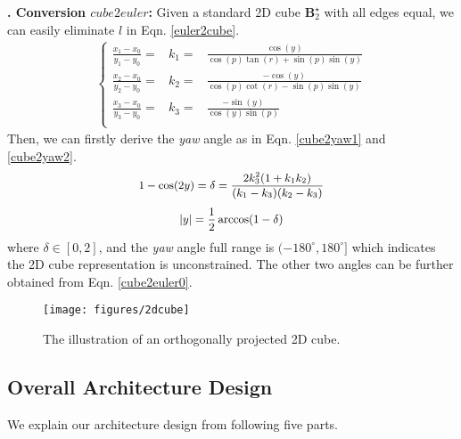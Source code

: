 \documentclass{article}
\begin{document}
{\bf {}. Conversion $cube2euler$:} Given a standard 2D cube $\mathbf{B}^\star_2$ with all edges equal, we can easily eliminate $l$ in Eqn. \ref{euler2cube}.
\begin{equation}\begin{aligned}
    \left\{ \begin{array}{rcl}
    \frac{x_1 - x_0}{y_1 - y_0} = & k_1 = & \frac{\cos(y)}{\cos(p)\tan(r) + \sin(p)\sin(y)} \\ 
    \frac{x_2 - x_0}{y_2 - y_0} = & k_2 = & \frac{-\cos(y)}{\cos(p)\cot(r) - \sin(p)\sin(y)} \\ 
    \frac{x_3 - x_0}{y_3 - y_0} = & k_3 = & \frac{-\sin(y)}{\cos(y)\sin(p)}\\ 
    \end{array}\right.
    \label{cube2euler0}
    \end{aligned}
\end{equation}
Then, we can firstly derive the {\it yaw} angle as in Eqn. \ref{cube2yaw1} and \ref{cube2yaw2}. 
\begin{equation}\small \begin{aligned}
    1 - \cos(2y) = \delta = \frac{2{k^2_3}(1 + k_1 k_2)}{(k_1 - k_3)(k_2 - k_3)}
    \label{cube2yaw1}
    \end{aligned}
\end{equation}
\begin{equation}\small \begin{aligned}
    |y| = \frac{1}{2}\arccos(1 - \delta)
    \label{cube2yaw2}
    \end{aligned}
\end{equation}
where $\delta \in [0, 2]$, and the {\it yaw} angle full range is $(-180^\circ, 180^\circ]$ which indicates the 2D cube representation is unconstrained. The other two angles can be further obtained from Eqn. \ref{cube2euler0}.

\begin{figure}[!t]
	\centering
	\texttt{[image: figures/2dcube]}
	\caption{The illustration of an orthogonally projected 2D cube.}
	\label{2dcube}
\end{figure}



\subsection{Overall Architecture Design}

We explain our architecture design from following five parts.
\end{document}

